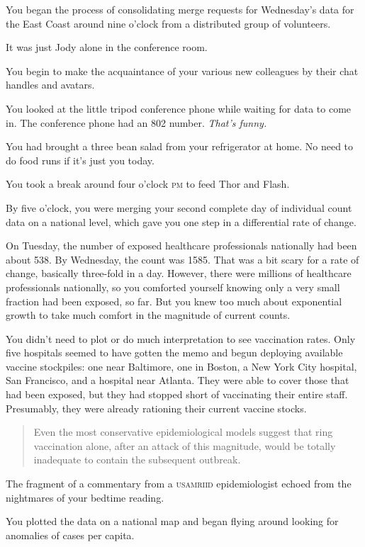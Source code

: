 \documentclass[a5paper, symmetric]{tufte-book}
\begin{document}
You began the process of consolidating merge requests for Wednesday's data for the East Coast around nine o'clock from a distributed group of volunteers. 

It was just Jody alone in the conference room. 

You begin to make the acquaintance of your various new colleagues by their chat handles and avatars. 

You looked at the little tripod conference phone while waiting for data to come in. The conference phone had an 802 number. \textit{That's funny.}

You had brought a three bean salad from your refrigerator at home. No need to do food runs if it's just you today.

You took a break around four o'clock \textsc{pm} to feed Thor and Flash.

By five o'clock, you were merging your second complete day of individual count data on a national level, which gave you one step in a differential rate of change. 

On Tuesday, the number of exposed healthcare professionals nationally had been about 538. By Wednesday, the count was 1585. That was a bit scary for a rate of change, basically three-fold in a day. However, there were millions of healthcare professionals nationally, so you comforted yourself knowing only a very small fraction had been exposed, so far. But you knew too much about exponential growth to take much comfort in the magnitude of current counts.

You didn't need to plot or do much interpretation to see vaccination rates. Only five hospitals seemed to have gotten the memo and begun deploying available vaccine stockpiles: one near Baltimore, one in Boston, a New York City hospital, San Francisco, and a hospital near Atlanta. They were able to cover those that had been exposed, but they had stopped short of vaccinating their entire staff. Presumably, they were already rationing their current vaccine stocks. 

\begin{quote}
Even the most conservative epidemiological models suggest that ring vaccination alone, after an attack of this magnitude, would be totally inadequate to contain the subsequent outbreak. 
\end{quote}

The fragment of a commentary from a \textsc{usamriid} epidemiologist echoed from the nightmares of your bedtime reading.

You plotted the data on a national map and began flying around looking for anomalies of cases per capita. 
\end{document}
